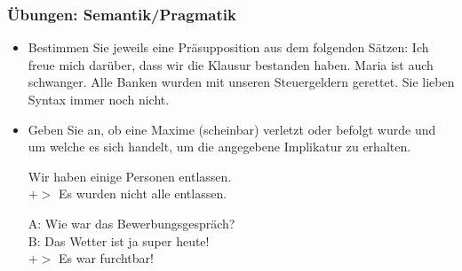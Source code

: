 \begin{frame}
\frametitle{Übungen: Semantik/Pragmatik}

\begin{itemize}
	
	\item Bestimmen Sie jeweils eine Präsupposition aus dem folgenden Sätzen:
	\eal
	\ex Ich freue mich darüber, dass wir die Klausur bestanden haben.
	\ex Maria ist auch schwanger.
	\ex Alle Banken wurden mit unseren Steuergeldern gerettet.
	\ex Sie lieben Syntax immer noch nicht.
	\zl

	\item Geben Sie an, ob eine Maxime (scheinbar) verletzt oder befolgt wurde und um welche es sich handelt, um die angegebene Implikatur zu erhalten.
	
	\ea Wir haben einige Personen entlassen.\\
	$+>$ Es wurden nicht alle entlassen.
	\z
	
	\ea A: Wie war das Bewerbungsgespräch?\\
	B: Das Wetter ist ja super heute!\\
	$+>$ Es war furchtbar!
	\z
		
\end{itemize}

\end{frame}

